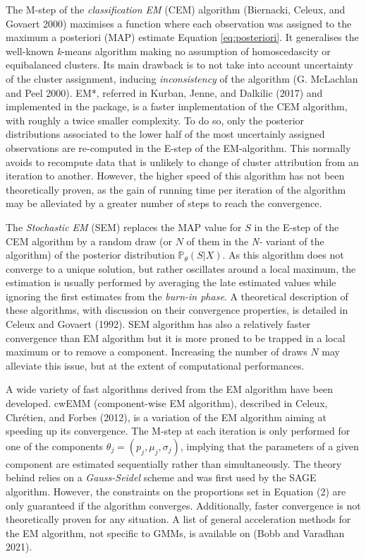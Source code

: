 The M-step of the \emph{classification EM} (CEM) algorithm
(Biernacki, Celeux, and Govaert 2000) maximises a function where each observation was
assigned to the maximum a posteriori (MAP) estimate Equation
\eqref{eq:posteriori}. It generalises the well-known \emph{k}-means algorithm
making no assumption of homoscedascity or equibalanced clusters. Its
main drawback is to not take into account uncertainty of the cluster
assignment, inducing \emph{inconsistency} of the algorithm
(G. McLachlan and Peel 2000). EM*, referred in Kurban, Jenne, and Dalkilic (2017) and implemented
in the  package, is a faster implementation of the CEM
algorithm, with roughly a twice smaller complexity. To do so, only the
posterior distributions associated to the lower half of the most
uncertainly assigned observations are re-computed in the E-step of the
EM-algorithm. This normally avoids to recompute data that is unlikely to
change of cluster attribution from an iteration to another. However, the
higher speed of this algorithm has not been theoretically proven, as the
gain of running time per iteration of the algorithm may be alleviated by
a greater number of steps to reach the convergence.

The \emph{Stochastic EM} (SEM) replaces the MAP value for \(S\) in the E-step
of the CEM algorithm by a random draw (or \(N\) of them in the \emph{N-}
variant of the algorithm) of the posterior distribution
\(\mathbb{P}_\theta (S|X)\). As this algorithm does not converge to a
unique solution, but rather oscillates around a local maximum, the
estimation is usually performed by averaging the late estimated values
while ignoring the first estimates from the \emph{burn-in phase}. A
theoretical description of these algorithms, with discussion on their
convergence properties, is detailed in Celeux and Govaert (1992). SEM algorithm
has also a relatively faster convergence than EM algorithm but it is
more proned to be trapped in a local maximum or to remove a component.
Increasing the number of draws \(N\) may alleviate this issue, but at the
extent of computational performances.

A wide variety of fast algorithms derived from the EM algorithm have
been developed. cwEMM (component-wise EM algorithm), described in
Celeux, Chrétien, and Forbes (2012), is a variation of the EM algorithm aiming at speeding up
its convergence. The M-step at each iteration is only performed for one
of the components \(\theta_j=(p_j, \mu_j, \sigma_j)\), implying that the
parameters of a given component are estimated sequentially rather than
simultaneously. The theory behind relies on a \emph{Gauss-Seidel} scheme and
was first used by the SAGE algorithm. However, the constraints on the
proportions set in Equation (2) are only guaranteed if the
algorithm converges. Additionally, faster convergence is not
theoretically proven for any situation. A list of general acceleration
methods for the EM algorithm, not specific to GMMs, is available on
 (Bobb and Varadhan 2021).

